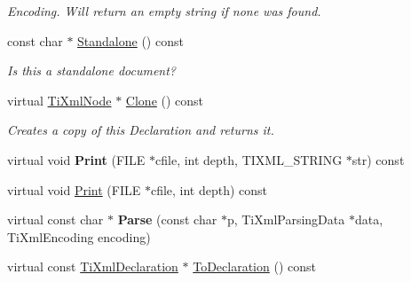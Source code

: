 \begin{DoxyCompactItemize}
\begin{DoxyCompactList}\small\item\em Encoding. Will return an empty string if none was found. \end{DoxyCompactList}\item 
\hypertarget{class_ti_xml_declaration_a9ff06afc033d7ef730ec7c6825b97ad9}{const char $\ast$ \hyperlink{class_ti_xml_declaration_a9ff06afc033d7ef730ec7c6825b97ad9}{Standalone} () const }\label{class_ti_xml_declaration_a9ff06afc033d7ef730ec7c6825b97ad9}

\begin{DoxyCompactList}\small\item\em Is this a standalone document? \end{DoxyCompactList}\item 
\hypertarget{class_ti_xml_declaration_a7cf459186040141cda7a180a6585ce2e}{virtual \hyperlink{class_ti_xml_node}{Ti\-Xml\-Node} $\ast$ \hyperlink{class_ti_xml_declaration_a7cf459186040141cda7a180a6585ce2e}{Clone} () const }\label{class_ti_xml_declaration_a7cf459186040141cda7a180a6585ce2e}

\begin{DoxyCompactList}\small\item\em Creates a copy of this Declaration and returns it. \end{DoxyCompactList}\item 
\hypertarget{class_ti_xml_declaration_a347cd8e2b0b5c65058c9f59a106e3d4c}{virtual void {\bfseries Print} (F\-I\-L\-E $\ast$cfile, int depth, T\-I\-X\-M\-L\-\_\-\-S\-T\-R\-I\-N\-G $\ast$str) const }\label{class_ti_xml_declaration_a347cd8e2b0b5c65058c9f59a106e3d4c}

\item 
virtual void \hyperlink{class_ti_xml_declaration_abf6303db4bd05b5be554036817ff1cb4}{Print} (F\-I\-L\-E $\ast$cfile, int depth) const 
\item 
\hypertarget{class_ti_xml_declaration_a12dbb498d45f74fe58cd05dde608a39d}{virtual const char $\ast$ {\bfseries Parse} (const char $\ast$p, Ti\-Xml\-Parsing\-Data $\ast$data, Ti\-Xml\-Encoding encoding)}\label{class_ti_xml_declaration_a12dbb498d45f74fe58cd05dde608a39d}

\item 
\hypertarget{class_ti_xml_declaration_a1e085d3fefd1dbf5ccdbff729931a967}{virtual const \hyperlink{class_ti_xml_declaration}{Ti\-Xml\-Declaration} $\ast$ \hyperlink{class_ti_xml_declaration_a1e085d3fefd1dbf5ccdbff729931a967}{To\-Declaration} () const }\label{class_ti_xml_declaration_a1e085d3fefd1dbf5ccdbff729931a967}


\end{DoxyCompactItemize}
